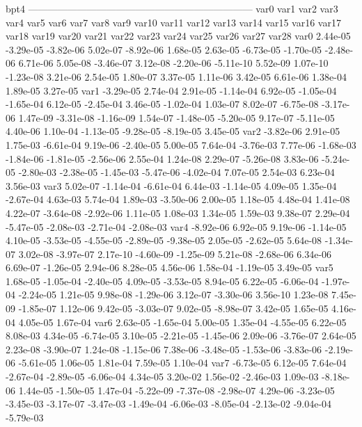 bpt4
---------------------------------------------------------------------
var0 var1 var2 var3 var4 var5 var6 var7 var8 var9 var10 var11 var12 var13 var14 var15 var16 var17 var18 var19 var20 var21 var22 var23 var24 var25 var26 var27 var28 
var0  2.44e-05 -3.29e-05 -3.82e-06  5.02e-07 -8.92e-06  1.68e-05  2.63e-05 -6.73e-05 -1.70e-05 -2.48e-06  6.71e-06  5.05e-08 -3.46e-07  3.12e-08 -2.20e-06 -5.11e-10  5.52e-09  1.07e-10 -1.23e-08  3.21e-06  2.54e-05  1.80e-07  3.37e-05  1.11e-06  3.42e-05  6.61e-06  1.38e-04  1.89e-05  3.27e-05
var1 -3.29e-05  2.74e-04  2.91e-05 -1.14e-04  6.92e-05 -1.05e-04 -1.65e-04  6.12e-05 -2.45e-04  3.46e-05 -1.02e-04  1.03e-07  8.02e-07 -6.75e-08 -3.17e-06  1.47e-09 -3.31e-08 -1.16e-09  1.54e-07 -1.48e-05 -5.20e-05  9.17e-07 -5.11e-05  4.40e-06  1.10e-04 -1.13e-05 -9.28e-05 -8.19e-05  3.45e-05
var2 -3.82e-06  2.91e-05  1.75e-03 -6.61e-04  9.19e-06 -2.40e-05  5.00e-05  7.64e-04 -3.76e-03  7.77e-06 -1.68e-03 -1.84e-06 -1.81e-05 -2.56e-06  2.55e-04  1.24e-08  2.29e-07 -5.26e-08  3.83e-06 -5.24e-05 -2.80e-03 -2.38e-05 -1.45e-03 -5.47e-06 -4.02e-04  7.07e-05  2.54e-03  6.23e-04  3.56e-03
var3  5.02e-07 -1.14e-04 -6.61e-04  6.44e-03 -1.14e-05  4.09e-05  1.35e-04 -2.67e-04  4.63e-03  5.74e-04  1.89e-03 -3.50e-06  2.00e-05  1.18e-05  4.48e-04  1.41e-08  4.22e-07 -3.64e-08 -2.92e-06  1.11e-05  1.08e-03  1.34e-05  1.59e-03  9.38e-07  2.29e-04 -5.47e-05 -2.08e-03 -2.71e-04 -2.08e-03
var4 -8.92e-06  6.92e-05  9.19e-06 -1.14e-05  4.10e-05 -3.53e-05 -4.55e-05 -2.89e-05 -9.38e-05  2.05e-05 -2.62e-05  5.64e-08 -1.34e-07  3.02e-08 -3.97e-07  2.17e-10 -4.60e-09 -1.25e-09  5.21e-08 -2.68e-06  6.34e-06  6.69e-07 -1.26e-05  2.94e-06  8.28e-05  4.56e-06  1.58e-04 -1.19e-05  3.49e-05
var5  1.68e-05 -1.05e-04 -2.40e-05  4.09e-05 -3.53e-05  8.94e-05  6.22e-05 -6.06e-04 -1.97e-04 -2.24e-05  1.21e-05  9.98e-08 -1.29e-06  3.12e-07 -3.30e-06  3.56e-10  1.23e-08  7.45e-09 -1.85e-07  1.12e-06  9.42e-05 -3.03e-07  9.02e-05 -8.98e-07  3.42e-05  1.65e-05  4.16e-04  4.05e-05  1.67e-04
var6  2.63e-05 -1.65e-04  5.00e-05  1.35e-04 -4.55e-05  6.22e-05  8.08e-03  4.34e-05 -6.74e-05  3.10e-05 -2.21e-05 -1.45e-06  2.09e-06 -3.76e-07  2.64e-05  2.23e-08 -3.90e-07  1.24e-08 -1.15e-06  7.38e-06 -3.48e-05 -1.53e-06 -3.83e-06 -2.19e-06 -5.61e-05  1.06e-05  1.81e-04  7.59e-05  1.10e-04
var7 -6.73e-05  6.12e-05  7.64e-04 -2.67e-04 -2.89e-05 -6.06e-04  4.34e-05  3.20e-02  1.56e-02 -2.46e-03  1.09e-03 -8.18e-06  1.44e-05 -1.50e-05  1.47e-04 -5.22e-09 -7.37e-08 -2.98e-07  4.29e-06 -3.23e-05 -3.45e-03 -3.17e-07 -3.47e-03 -1.49e-04 -6.06e-03 -8.05e-04 -2.13e-02 -9.04e-04 -5.79e-03
